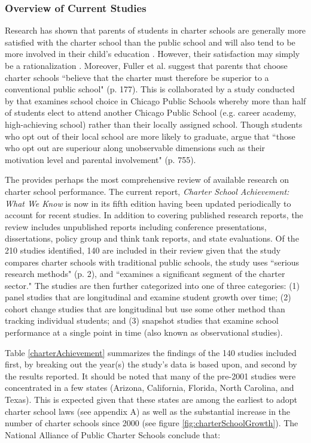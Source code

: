 \documentclass[letterpaper,12p,twoside]{article} %
\begin{document}
\subsubsection{Overview of Current Studies}
Research has shown that parents of students in charter schools are generally more satisfied with the charter school than the public school and will also tend to be more involved in their child's education \cite{teske2001,vanourek1998}. However, their satisfaction may simply be a rationalization \cite{hubbard2009}. Moreover, Fuller et al. \cite<1996, as cited in>{hubbard2009} suggest that parents that choose charter schools ``believe that the charter must therefore be superior to a conventional public school" (p. 177). This is collaborated by a study conducted by  that examines school choice in Chicago Public Schools whereby more than half of students elect to attend another Chicago Public School (e.g. career academy, high-achieving school) rather than their locally assigned school. Though students who opt out of their local school are more likely to graduate,  argue that ``those who opt out are superiour along unobservable dimensions such as their motivation level and parental involvement" (p. 755). 

The  provides perhaps the most comprehensive review of available research on charter school performance. The current report, \textit{Charter School Achievement: What We Know} is now in its fifth edition having been updated periodically to account for recent studies. In addition to covering published research reports, the review includes unpublished reports including conference presentations, dissertations, policy group and think tank reports, and state evaluations. Of the 210 studies identified, 140 are included in their review given that the study compares charter schools with traditional public schools, the study uses ``serious research methods" (p. 2), and ``examines a significant segment of the charter sector." The studies are then further categorized into one of three categories: (1) panel studies that are longitudinal and examine student growth over time; (2) cohort change studies that are longitudinal but use some other method than tracking individual students; and (3) snapshot studies that examine school performance at a single point in time (also known as observational studies).

Table \ref{charterAchievement} summarizes the findings of the 140 studies included first, by breaking out the year(s) the study's data is based upon, and second by the results reported. It should be noted that many of the pre-2001 studies were concentrated in a few states (Arizona, California, Florida, North Carolina, and Texas). This is expected given that these states are among the earliest to adopt charter school laws (see appendix A) as well as the substantial increase in the number of charter schools since 2000 (see figure \ref{fig:charterSchoolGrowth}). The National Alliance of Public Charter Schools conclude that:
\end{document}
